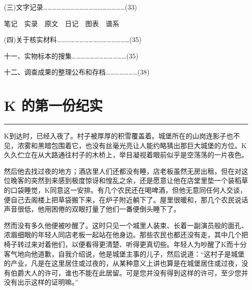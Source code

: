 \documentclass[12pt,a4paper]{article}
\begin{document}
\noindent\hspace{2.5em}(三)文字记录………………………………………………(33)

\noindent\hspace{3.5em}笔记　实录　原文　日记　图表　谱系

\noindent\hspace{2.5em}(四)关于核实材料…………………………………………(35)



\noindent\hspace{1em}十一、实物标本的搜集………………………………(35)



\noindent\hspace{1em}十二、调查成果的整理公布和存档…………………(38)
\par{}
\newpage
\section{K 的第一份纪实}
\vspace{0.5em}
\vspace{0.3em}

\noindent\rule{\textwidth}{0.4pt}

\vspace{0.3em}



K到达时，已经入夜了。村子被厚厚的积雪覆盖着。城堡所在的山岗连影子也不见，浓雾和黑暗包围着它，也没有丝毫光亮让人能约略猜出那巨大城堡的方位。K久久伫立在从大路通往村子的木桥上，举目凝视着眼前似乎是空荡荡的一片夜色。

然后他去找过夜的地方；酒店里人们还都没有睡，店老板虽然无房出租，但在对这位晚客的突然到来感到极度惊讶和惶乱之余，还是愿意让他在店堂里垫一个装稻草的口袋睡觉，K同意这一安排。有几个农民还在喝啤酒，但他无意同任何人交谈，便自己去阁楼上把草袋搬下来，在炉子附近躺下了。屋里很暖和，那几个农民说话声音很低，他用困倦的双眼打量了他们一番便倒头睡下了。

然而没有多久他便被吵醒了。这时只见一个城里人装束、长着一副演员般的面孔、浓眉细眼的年轻人同店老板一起站在他身边。那些农民也都还没有走，其中几个把椅子转过来对着他们，以便看得更清楚、听得更真切些。年轻人为吵醒了K而十分客气地向他道歉，自我介绍说，他是城堡主事的儿子，然后说道：“这村子是城堡的产业，凡是在这里居住或过夜的，从某种意义上讲也算是在城堡居住或过夜，没有伯爵大人的许可，谁也不能在此居留。可是您并没有得到这样的许可，至少您并没有出示这样的证明嘛。”
\end{document}
